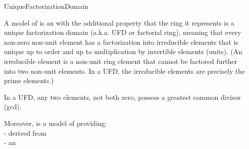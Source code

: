 \begin{ccRefConcept}{UniqueFactorizationDomain}


\ccDefinition


A model of  is an  with the additional property 
that the ring it represents is a unique factorization domain 
(a.k.a. UFD or factorial ring), meaning that every non-zero non-unit 
element has a factorization into irreducible elements that is unique 
up to order and up to multiplication by invertible elements (units). 
(An irreducible element is a non-unit ring element that cannot be factored 
further into two non-unit elements. In a UFD, the irreducible elements 
are precisely the prime elements.)

In a UFD, any two elements, not both zero, possess a greatest common 
divisor (gcd). 

Moreover,  is a model of 
 providing:\\
 
-  derived from  \\
-  an \\
  

 
\ccRefines
 
\ccSeeAlso

\\
\\
\\
\\
\\
\\
\\

\ccHasModels


\end{ccRefConcept}